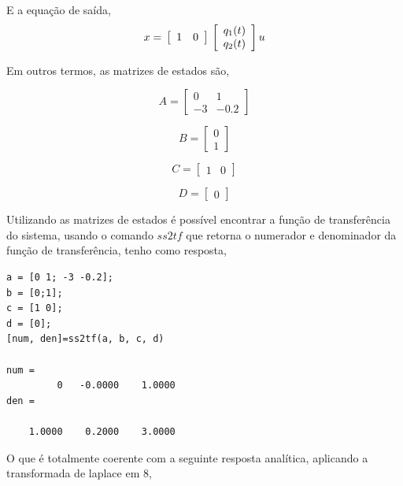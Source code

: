 \documentclass[paper=a4, fontsize=11pt]{article}
\begin{document}
\begin{list}{\textbf{Questão .}}{
\setlength{\labelwidth}{-2mm} \setlength{\parsep}{0mm}
\setlength{\topsep}{0mm} \setlength{\leftmargin}{0mm}}
		E a equação de saída,
        \begin{equation}
          x = \\
          \left[\begin{array}{rr}
          1 & 0
          \end{array}\right] \\
          \left[\begin{array}{c}
          q_1(t) \\
          q_2(t)
          \end{array}\right] u
		\end{equation}
        
        
        Em outros termos, as matrizes de estados são,
        
        $$
        A =\left[\begin{array}{rr}
          0 & 1 \\
          -3 & -0.2
          \end{array}\right]
        $$
        
        $$
        B = \left[\begin{array}{r}
          0 \\
          1
          \end{array}\right]
        $$
        
        $$
        C = \left[\begin{array}{rr}
          1 & 0
          \end{array}\right]
        $$
        
        $$
        D = \left[\begin{array}{r}
        0 
        \end{array}\right]
        $$ 
        
        Utilizando as matrizes de estados é possível encontrar
        a função de transferência do sistema, usando o comando       
        $ss2tf$ que retorna o numerador e denominador da função
        de transferência, tenho como resposta,
        
        
		\begin{lstlisting}
a = [0 1; -3 -0.2];
b = [0;1];
c = [1 0];
d = [0];
[num, den]=ss2tf(a, b, c, d)

num = 
         0   -0.0000    1.0000
den =

    1.0000    0.2000    3.0000
		\end{lstlisting}   
        
        O que é totalmente coerente com a seguinte resposta 
        analítica, aplicando a transformada de laplace em 8,
        

\end{list}
\end{document}
